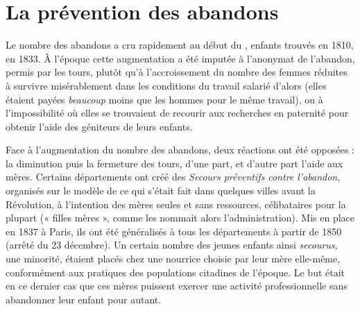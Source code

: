 \section{La prévention des abandons}

 Le nombre des abandons a cru rapidement au début du ,  enfants trouvés en 1810,  en 1833. À l'époque cette augmentation a été imputée à l'anonymat de l'abandon, permis par les tours, plutôt qu'à l'accroissement du nombre des femmes réduites à survivre misérablement dans les conditions du travail salarié d'alors (elles étaient payées \emph{beaucoup} moins que les hommes pour le même travail), ou à l'impossibilité où elles se trouvaient de recourir aux recherches en paternité pour obtenir l'aide des géniteurs de leurs enfants.

 Face à l'augmentation du nombre des abandons, deux réactions ont été opposées : la diminution puis la fermeture des tours, d'une part, et d'autre part l'aide aux mères. Certains départements ont créé des \emph{Secours préventifs contre l'abandon}, organisés sur le modèle de ce qui s'était fait dans quelques villes avant la Révolution, à l'intention des mères seules et sans ressources, célibataires pour la plupart (« filles mères », comme les nommait alors l'administration). Mis en place en 1837 à Paris, ils ont été généralisés à tous les départements à partir de 1850 (arrêté du 23 décembre). Un certain nombre des jeunes enfants ainsi \emph{secourus}, une minorité, étaient placés chez une nourrice choisie par leur mère elle-même, conformément aux pratiques des populations citadines de l'époque. Le but était en ce dernier cas que ces mères puissent exercer une activité professionnelle sans abandonner leur enfant pour autant.

